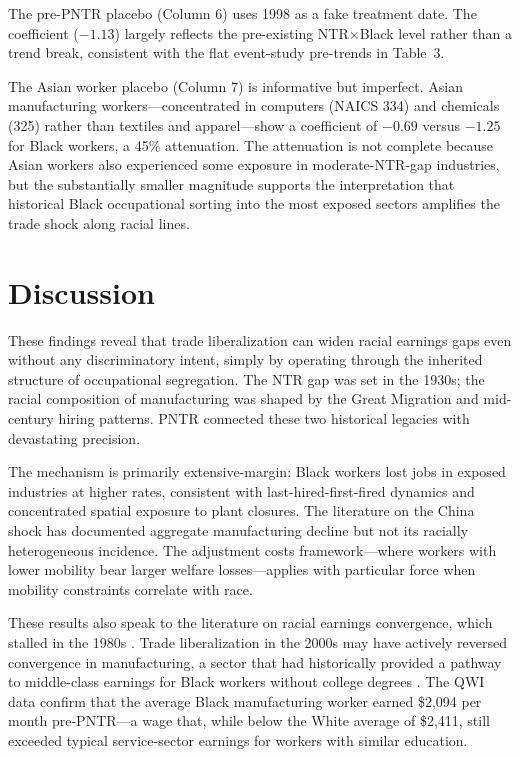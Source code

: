 \documentclass[12pt]{article}
\begin{document}


The pre-PNTR placebo (Column 6) uses 1998 as a fake treatment date. The coefficient ($-1.13$) largely reflects the pre-existing NTR$\times$Black level rather than a trend break, consistent with the flat event-study pre-trends in Table~3.

The Asian worker placebo (Column 7) is informative but imperfect. Asian manufacturing workers---concentrated in computers (NAICS 334) and chemicals (325) rather than textiles and apparel---show a coefficient of $-0.69$ versus $-1.25$ for Black workers, a 45\% attenuation. The attenuation is not complete because Asian workers also experienced some exposure in moderate-NTR-gap industries, but the substantially smaller magnitude supports the interpretation that historical Black occupational sorting into the most exposed sectors amplifies the trade shock along racial lines.

\section{Discussion}

These findings reveal that trade liberalization can widen racial earnings gaps even without any discriminatory intent, simply by operating through the inherited structure of occupational segregation. The NTR gap was set in the 1930s; the racial composition of manufacturing was shaped by the Great Migration and mid-century hiring patterns. PNTR connected these two historical legacies with devastating precision.

The mechanism is primarily extensive-margin: Black workers lost jobs in exposed industries at higher rates, consistent with last-hired-first-fired dynamics and concentrated spatial exposure to plant closures. The literature on the China shock \citep{autor2013, pierce2016, acemoglu2016} has documented aggregate manufacturing decline but not its racially heterogeneous incidence. The \citet{autor2014} adjustment costs framework---where workers with lower mobility bear larger welfare losses---applies with particular force when mobility constraints correlate with race.

These results also speak to the literature on racial earnings convergence, which stalled in the 1980s \citep{bound1992, neal1996}. Trade liberalization in the 2000s may have actively reversed convergence in manufacturing, a sector that had historically provided a pathway to middle-class earnings for Black workers without college degrees \citep{wilson2000}. The QWI data confirm that the average Black manufacturing worker earned \$2,094 per month pre-PNTR---a wage that, while below the White average of \$2,411, still exceeded typical service-sector earnings for workers with similar education.
\end{document}
